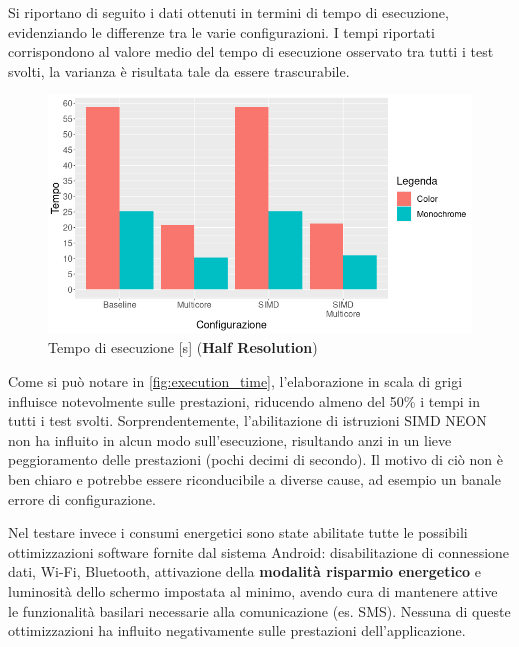 Si riportano di seguito i dati ottenuti in termini di tempo di esecuzione, evidenziando le differenze tra le varie configurazioni.
I tempi riportati corrispondono al valore medio del tempo di esecuzione osservato tra tutti i test svolti, la varianza è 
risultata tale da essere trascurabile.

\begin{figure}[h!]
    \begin{center}
        \includegraphics[scale=0.45]{img/execution_time.png}
        \caption{Tempo di esecuzione [s] (\textbf{Half Resolution})}
        \label{fig:execution_time}
    \end{center}
\end{figure}

Come si può notare in \autoref{fig:execution_time}, l'elaborazione in scala di grigi influisce notevolmente sulle prestazioni, riducendo almeno del 50\% i tempi
in tutti i test svolti. Sorprendentemente, l'abilitazione di istruzioni SIMD NEON non ha influito in alcun modo 
sull'esecuzione, risultando anzi in un lieve peggioramento delle prestazioni (pochi decimi di secondo). Il motivo di ciò non è
ben chiaro e potrebbe essere riconducibile a diverse cause, ad esempio un banale errore di configurazione.

\newpage

Nel testare invece i consumi energetici sono state abilitate tutte le possibili ottimizzazioni software fornite dal sistema 
Android: disabilitazione di connessione dati, Wi-Fi, Bluetooth, attivazione della \textbf{modalità risparmio energetico} e
luminosità dello schermo impostata al minimo, avendo cura di mantenere attive le funzionalità basilari necessarie alla comunicazione (es. SMS). Nessuna di queste 
ottimizzazioni ha influito negativamente sulle prestazioni dell'applicazione.

